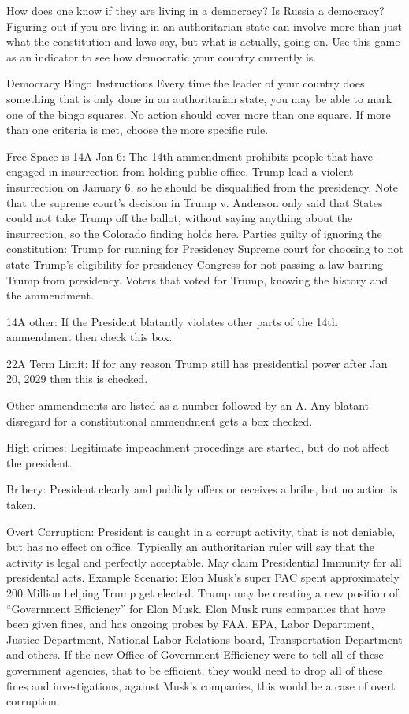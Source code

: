 \documentclass{article}
\begin{document}
How does one know if they are living in a democracy?  Is Russia a democracy?
Figuring out if you are living in an authoritarian state can involve more than just
what the constitution and laws say, but what is actually, going on.
Use this game as an indicator to see how democratic your country currently is.

Democracy Bingo Instructions
Every time the leader of your country does something that is only done in an authoritarian state,
you may be able to mark one of the bingo squares.  No action should cover more than one square.
If more than one criteria is met, choose the more specific rule.

Free Space is 14A Jan 6:
The 14th ammendment prohibits people that have engaged in insurrection from
holding public office.  Trump lead a violent insurrection on January 6, so he should be disqualified
from the presidency.  Note that the supreme court's decision in Trump v. Anderson only said that
States could not take Trump off the ballot, without saying anything about the insurrection,
so the Colorado finding holds here.
Parties guilty of ignoring the constitution:
Trump for running for Presidency
Supreme court for choosing to not state Trump's eligibility for presidency
Congress for not passing a law barring Trump from presidency.
Voters that voted for Trump, knowing the history and the ammendment.

14A other: If the President blatantly violates other parts of the 14th ammendment
then check this box.

22A Term Limit: If for any reason Trump still has presidential power after Jan 20, 2029
then this is checked.

Other ammendments are listed as a number followed by an A.  Any blatant disregard for
a constitutional ammendment gets a box checked.

High crimes: Legitimate impeachment procedings are started, but do not affect the president.

Bribery:  President clearly and publicly offers or receives a bribe, but no action is
taken.

Overt Corruption: President is caught in a corrupt activity, that is not deniable, but
has no effect on office.  Typically an authoritarian ruler will say that the activity is
legal and perfectly acceptable.  May claim Presidential Immunity for all presidental
acts.
Example Scenario:  Elon Musk's super PAC spent approximately 200 Million helping Trump
get elected.
Trump may be creating a new position of ``Government Efficiency'' for Elon Musk.
Elon Musk runs companies that have been given fines, and has ongoing probes by FAA, EPA,
Labor Department, Justice Department, National Labor Relations board, Transportation Department
and others.  If the new Office of Government Efficiency were to tell all of these government
agencies, that to be efficient, they would need to drop all of these fines and investigations,
against Musk's companies, this would be a case of overt corruption.
\end{document}

